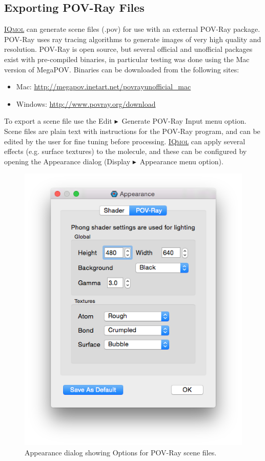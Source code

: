 \documentclass[a4paper,12pt]{article}
\newcommand{\iqmol}{\href{http://iqmol.org}{{\scshape IQmol}}}
\newcommand{\bt}{\ensuremath{\blacktriangleright}}
\begin{document}
\subsection{Exporting POV-Ray Files}

\iqmol{} can generate scene files (.pov) for use with an external POV-Ray package.
POV-Ray uses ray tracing algorithms to generate images of very high quality and
resolution.  POV-Ray is open source, but several official and unofficial
packages exist with pre-compiled binaries, in particular testing was done using
the Mac version of MegaPOV.  Binaries can be downloaded from the
following sites:
\begin{itemize}
\itemsep0em
\item Mac: \url{http://megapov.inetart.net/povrayunofficial_mac}
\item Windows: \url{http://www.povray.org/download}
\end{itemize}

To export a scene file use the Edit \bt\ Generate POV-Ray Input menu option.
Scene files are plain text with instructions for the POV-Ray program, and can
be edited by the user for fine tuning before processing.  \iqmol{} can apply
several effects (e.g. surface textures) to the molecule, and these can be
configured by opening the Appearance dialog (Display \bt\ Appearance menu
option).

\begin{figure}[h]
\begin{center}
\includegraphics[scale=0.20]{figures/POVRayDialog.png}
\caption{Appearance dialog showing Options for POV-Ray scene files.}
\end{center}
\end{figure}
\end{document}
